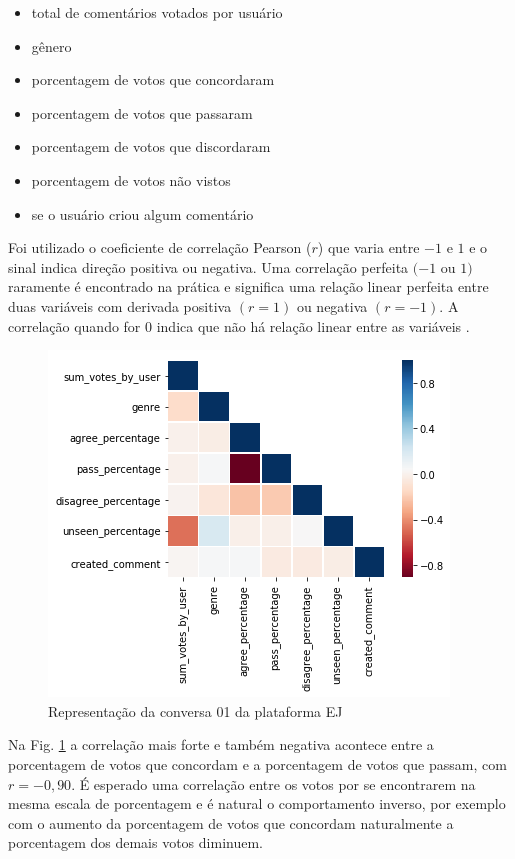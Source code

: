 \begin{itemize}
\item total de comentários votados por usuário
\item gênero
\item porcentagem de votos que concordaram
\item porcentagem de votos que passaram
\item porcentagem de votos que discordaram
\item porcentagem de votos não vistos
\item se o usuário criou algum comentário
\end{itemize}

Foi utilizado o coeficiente de correlação Pearson ($r$) que varia entre $-1$ e $1$ e o sinal indica direção positiva ou negativa. Uma correlação perfeita $(-1$ ou $1)$ raramente é encontrado na prática e significa uma relação linear perfeita entre duas variáveis com derivada positiva $(r=1)$ ou negativa $(r=-1)$. A correlação quando for $0$ indica que não há relação linear entre as variáveis \cite{filho2009}. 


\begin{figure}[!h]
	\centering
	\includegraphics[keepaspectratio=true,scale=0.8]{figuras/tcc2/corr_por_usuarios_1-1.png}
	\caption{Representação da conversa 01 da plataforma EJ}
	\label{fig:corr-por-usuarios-1}
\end{figure}

Na Fig. \ref{fig:corr-por-usuarios-1} a correlação mais forte e também negativa acontece entre a porcentagem de votos que concordam e a porcentagem de votos que passam, com  $r=-0,90$. É esperado uma correlação entre os votos por se encontrarem na mesma escala de porcentagem e é natural o comportamento inverso, por exemplo com o aumento da porcentagem de votos que concordam naturalmente a porcentagem dos demais votos diminuem.

